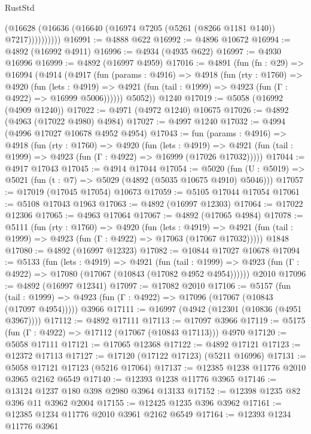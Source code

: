 \begin{lexlean}{RustStd}
\begin{coremodule}
                (@16628 (@16636 (@16640 (@16974 @7205 (@5261 (@8266 @1181 @140)) @7217))))))))))
@16991 := @4888 @622
@16992 := @4896 @10672
@16994 := @4892 (@16992 @4911)
@16996 := @4934 (@4935 @622)
@16997 := @4930 @16996
@16999 := @4892 (@16997 @4959)
@17016 := @4891
    (fun (fn : @29) =>
    @16994
      (@4914
        (@4917
          (fun (params : @4916) =>
          @4918
            (fun (rty : @1760) =>
            @4920
              (fun (lets : @4919) =>
              @4921 (fun (tail : @1999) => @4923 (fun (Γ : @4922) => @16999 @5006))))))
        @5052))
    @1240
@17019 := @5058 (@16992 (@4909 @1240))
@17022 := @4971 (@4972 @1240) @10675
@17026 := @4892 (@4963 (@17022 @4980) @4984)
@17027 := @4997 @1240
@17032 := @4994 (@4996 @17027 @10678 @4952 @4954)
@17043 := fun (params : @4916) =>
  @4918
    (fun (rty : @1760) =>
    @4920
      (fun (lets : @4919) =>
      @4921 (fun (tail : @1999) => @4923 (fun (Γ : @4922) => @16999 (@17026 @17032)))))
@17044 := @4917 @17043
@17045 := @4914 @17044
@17054 := @5020
    (fun (U : @5019) => @5021 (fun (t : @7) => @5029 (@4892 (@5035 @10675 @4910) @5046)))
@17057 := @17019 (@17045 @17054) @10673
@17059 := @5105 @17044 @17054
@17061 := @5108 @17043 @1963
@17063 := @4892 (@16997 @12303)
@17064 := @17022 @12306
@17065 := @4963 @17064
@17067 := @4892 (@17065 @4984)
@17078 := @5111
    (fun (rty : @1760) =>
    @4920
      (fun (lets : @4919) =>
      @4921 (fun (tail : @1999) => @4923 (fun (Γ : @4922) => @17063 (@17067 @17032)))))
    @1848
@17080 := @4892 (@16997 @12323)
@17082 := @10844 @17027 @10678
@17094 := @5133
    (fun (lets : @4919) =>
    @4921
      (fun (tail : @1999) =>
      @4923 (fun (Γ : @4922) => @17080 (@17067 (@10843 (@17082 @4952 @4954))))))
    @2010
@17096 := @4892 (@16997 @12341)
@17097 := @17082 @2010
@17106 := @5157
    (fun (tail : @1999) => @4923 (fun (Γ : @4922) => @17096 (@17067 (@10843 (@17097 @4954)))))
    @3966
@17111 := @16997 (@4942 (@12301 (@10836 (@4951 @3967))))
@17112 := @4892 @17111
@17113 := @17097 @3966
@17119 := @5175 (fun (Γ : @4922) => @17112 (@17067 (@10843 @17113))) @4970
@17120 := @5058 @17111
@17121 := @17065 @12368
@17122 := @4892 @17121
@17123 := @12372 @17113
@17127 := @17120 (@17122 @17123) (@5211 @16996)
@17131 := @5058 @17121 @17123 (@5216 @17064)
@17137 := @12385 @1238 @11776 @2010 @3965 @2162 @6549
@17140 := @12393 @1238 @11776 @3965
@17146 := @13124 @1237 @180 @398 @2980 @3964 @13133
@17152 := @12398 @1235 @82 @396 @11 @3962 @2004
@17155 := @12425 @1235 @396 @3962
@17161 := @12385 @1234 @11776 @2010 @3961 @2162 @6549
@17164 := @12393 @1234 @11776 @3961

\end{coremodule}
\end{lexlean}
